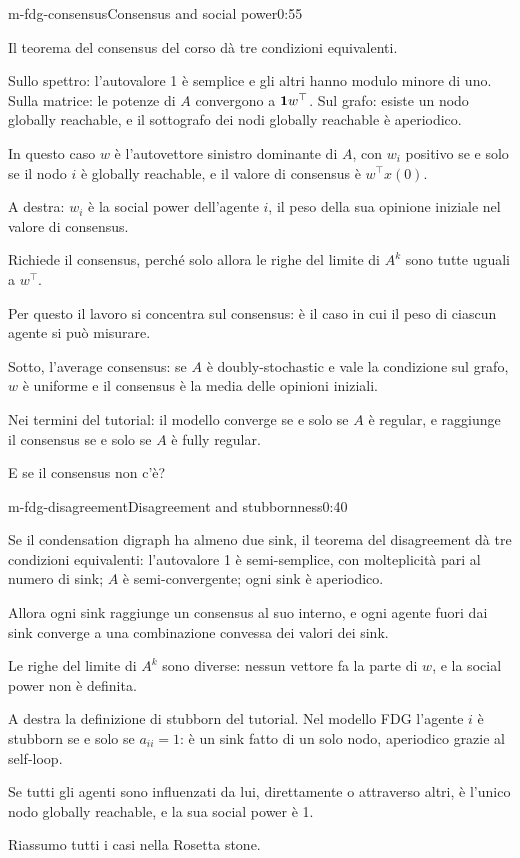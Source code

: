 \begin{slide}{m-fdg-consensus}{Consensus and social power}{0:55}
  \begin{discorso}
    \item Il teorema del consensus del corso dà tre condizioni equivalenti.
    \item Sullo spettro: l'autovalore 1 è semplice e gli altri hanno modulo minore di uno. Sulla matrice: le potenze di $A$ convergono a $\mathbf{1} w^\top$. Sul grafo: esiste un nodo globally reachable, e il sottografo dei nodi globally reachable è aperiodico.
    \item In questo caso $w$ è l'autovettore sinistro dominante di $A$, con $w_i$ positivo se e solo se il nodo $i$ è globally reachable, e il valore di consensus è $w^\top x(0)$.
    \item A destra: $w_i$ è la social power dell'agente $i$, il peso della sua opinione iniziale nel valore di consensus.
    \item Richiede il consensus, perché solo allora le righe del limite di $A^k$ sono tutte uguali a $w^\top$.
    \item Per questo il lavoro si concentra sul consensus: è il caso in cui il peso di ciascun agente si può misurare.
    \item Sotto, l'average consensus: se $A$ è doubly-stochastic e vale la condizione sul grafo, $w$ è uniforme e il consensus è la media delle opinioni iniziali.
    \item Nei termini del tutorial: il modello converge se e solo se $A$ è regular, e raggiunge il consensus se e solo se $A$ è fully regular.
    \item E se il consensus non c'è?
  \end{discorso}
\end{slide}

\begin{slide}{m-fdg-disagreement}{Disagreement and stubbornness}{0:40}
  \begin{discorso}
    \item Se il condensation digraph ha almeno due sink, il teorema del disagreement dà tre condizioni equivalenti: l'autovalore 1 è semi-semplice, con molteplicità pari al numero di sink; $A$ è semi-convergente; ogni sink è aperiodico.
    \item Allora ogni sink raggiunge un consensus al suo interno, e ogni agente fuori dai sink converge a una combinazione convessa dei valori dei sink.
    \item Le righe del limite di $A^k$ sono diverse: nessun vettore fa la parte di $w$, e la social power non è definita.
    \item A destra la definizione di stubborn del tutorial. Nel modello FDG l'agente $i$ è stubborn se e solo se $a_{ii}=1$: è un sink fatto di un solo nodo, aperiodico grazie al self-loop.
    \item Se tutti gli agenti sono influenzati da lui, direttamente o attraverso altri, è l'unico nodo globally reachable, e la sua social power è 1.
    \item Riassumo tutti i casi nella Rosetta stone.
  \end{discorso}
\end{slide}

